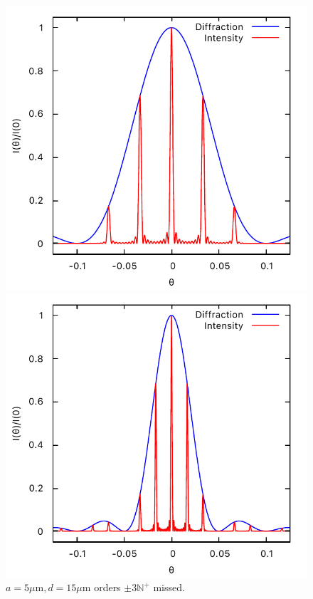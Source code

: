 \documentclass[11pt, twoside]{article}   	%
\theoremstyle{plain}
\theoremstyle{definition}
\begin{document}
\begin{description}
\begin{figure}[htbp]
		\begin{minipage}[t]{0.33\linewidth}
		\centering
		\includegraphics[width=0.9\linewidth]{5-15}
		\caption{\centering $a = 5\mu\mathrm{m}, d = 15\mu\mathrm{m}$
			\newline orders $\pm 3\mathbb N^+$ missed.}
		\end{minipage}
		\begin{minipage}[t]{0.33\linewidth}
		\centering
		\includegraphics[width=0.9\linewidth]{10-30}

\end{minipage}
\end{figure}
\end{description}
\end{document}
